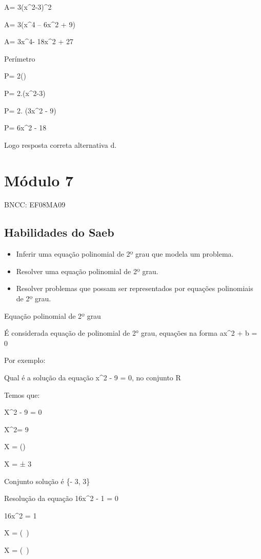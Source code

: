 A= 3\times (x^2-3)^2

A= 3\times (x^4 -- 6x^2 + 9)

A= 3x^4- 18x^2 + 27

Perímetro

P= 2()

P= 2.(x^2-3)

P= 2. (3x^2 - 9)

P= 6x^2 - 18

Logo resposta correta alternativa d.

\chapter{Módulo 7}

BNCC: EF08MA09

\section{Habilidades do Saeb}

\begin{itemize}

\item 
  Inferir uma equação polinomial de 2º grau que modela um problema.

\item 
  Resolver uma equação polinomial de 2º grau.

\item 
  Resolver problemas que possam ser representados por equações
  polinomiais de 2º grau.
\end{itemize}

Equação polinomial de 2º grau

É considerada equação de polinomial de 2° grau, equações na forma ax^2 +
b = 0

Por exemplo:

Qual é a solução da equação x^2 - 9 = 0, no conjunto R

Temos que:

X^2 - 9 = 0

X^2= 9

X = ()

X = ± 3

Conjunto solução é \{- 3, 3\}

Resolução da equação 16x^2 - 1 = 0

16x^2 = 1

X = (\  \pm {})

X = (\  \pm {})

